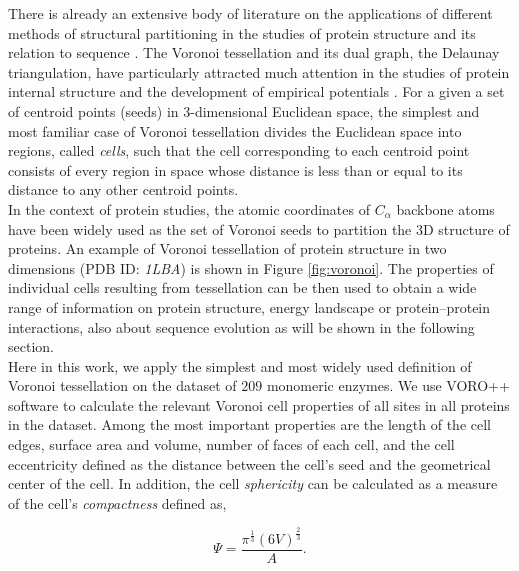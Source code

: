 \documentclass[11pt]{article}
\begin{document}
    There is already an extensive body of literature on the applications of different methods of structural partitioning in the studies of protein structure and its relation to sequence \cite{richards_interpretation_1974, gerstein_volume_1994}. The Voronoi tessellation and its dual graph, the Delaunay triangulation, have particularly attracted much attention in the studies of protein internal structure and the development of empirical potentials \cite{zomorodian_geometric_2006, zhou_alpha_2014, xia_identifying_2014}. For a given a set of centroid points (seeds) in 3-dimensional Euclidean space, the simplest and most familiar case of Voronoi tessellation divides the Euclidean space into regions, called {\it cells}, such that the cell corresponding to each centroid point consists of every region in space whose distance is less than or equal to its distance to any other centroid points. \\


    In the context of protein studies, the atomic coordinates of $C_\alpha$ backbone atoms have been widely used as the set of Voronoi seeds to partition the 3D structure of proteins. An example of Voronoi tessellation of protein structure in two dimensions (PDB ID: {\it 1LBA}) is shown in Figure \ref{fig:voronoi}.  The properties of individual cells resulting from tessellation can be then used to obtain a wide range of information on protein structure, energy landscape or protein--protein interactions, also about sequence evolution as will be shown in the following section. \\

    Here in this work, we apply the simplest and most widely used definition of Voronoi tessellation on the dataset of $209$  monomeric enzymes. We use VORO++ software \cite{rycroft_voro++:_2009} to calculate the relevant Voronoi cell properties of all sites in all proteins in the dataset. Among the most important properties are the length of the cell edges, surface area and volume, number of faces of each cell, and the cell eccentricity defined as the distance between the cell's seed and the geometrical center of the cell. In addition, the cell {\it sphericity} can be calculated as a measure of the cell's {\it compactness} defined as,

    \begin{equation}
        \label{eqn:sphericity}
        \Psi = \frac{\pi^{\frac{1}{3}}(6V)^{\frac{2}{3}}}{A}.
    \end{equation}
\end{document}
